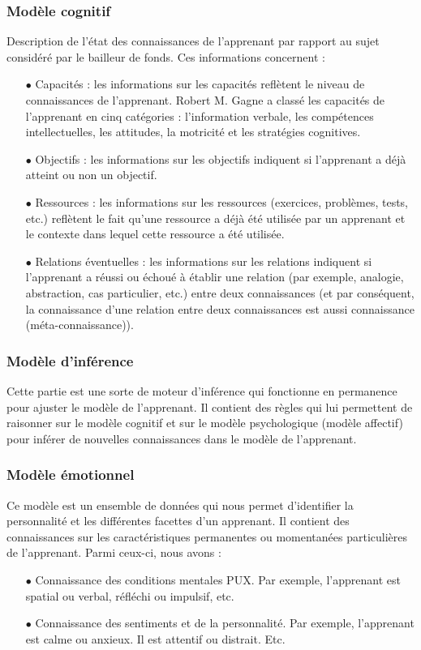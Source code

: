 \subsubsection{Modèle cognitif}
Description de l’état des connaissances de l’apprenant par rapport au sujet considéré par le bailleur de fonds. Ces informations concernent :
\begin{itemize}
	\item[$\bullet$] Capacités : les informations sur les capacités reflètent le niveau de connaissances de l'apprenant. Robert M. Gagne a classé les capacités de l’apprenant en cinq catégories : l’information verbale, les compétences intellectuelles, les attitudes, la motricité et les stratégies cognitives.
	\item[$\bullet$] Objectifs : les informations sur les objectifs indiquent si l'apprenant a déjà atteint ou non un objectif.
	\item[$\bullet$] Ressources : les informations sur les ressources (exercices, problèmes, tests, etc.) reflètent le fait qu'une ressource a déjà été utilisée par un apprenant et le contexte dans lequel cette ressource a été utilisée.
	\item[$\bullet$] Relations éventuelles : les informations sur les relations indiquent si l'apprenant a réussi ou échoué à établir une relation (par exemple, analogie, abstraction, cas particulier, etc.) entre deux connaissances (et par conséquent, la connaissance d'une relation entre deux connaissances est aussi connaissance (méta-connaissance)).
\end{itemize}

\subsubsection{Modèle d'inférence}
Cette partie est une sorte de moteur d’inférence qui fonctionne en permanence pour ajuster le modèle de l’apprenant. Il contient des règles qui lui permettent de raisonner sur le modèle cognitif et sur le modèle psychologique (modèle affectif) pour inférer de nouvelles connaissances dans le modèle de l’apprenant.

\subsubsection{Modèle émotionnel}
Ce modèle est un ensemble de données qui nous permet d'identifier la personnalité et les différentes facettes d'un apprenant. Il contient des connaissances sur les caractéristiques permanentes ou momentanées particulières de l’apprenant. Parmi ceux-ci, nous avons :
\begin{itemize}
	\item[$\bullet$] Connaissance des conditions mentales PUX. Par exemple, l'apprenant est spatial ou verbal, réfléchi ou impulsif, etc.
	\item[$\bullet$] Connaissance des sentiments et de la personnalité. Par exemple, l'apprenant est calme ou anxieux. Il est attentif ou distrait. Etc.
\end{itemize}

